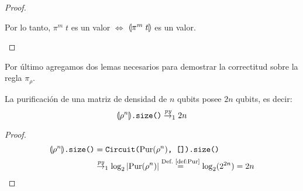 \begin{proof}
\begin{itemize}
Por lo tanto, $\pi^m\;t$ es un valor $\Leftrightarrow$ $\llparenthesis \pi^m\;t \rrparenthesis$ es un valor.
     
\end{itemize}

\end{proof}
Por último agregamos dos lemas necesarios para demostrar la correctitud sobre la regla $\pi_\rho$.
\begin{lema}\label{lem:rhosize}
La purificación de una matriz de densidad de $n$ qubits posee $2n$ qubits, es decir:
\vspace{0pt plus 20pt}
\begin{equation*}
    \texttt{\ensuremath{\llparenthesis \rho^n \rrparenthesis}.size()} \overset{\textit{py}}{\rightarrow}_1 2n
\end{equation*}
\vspace{0pt plus 20pt}
\end{lema}
\begin{proof}
    \begin{align*}
        \texttt{\ensuremath{\llparenthesis \rho^n \rrparenthesis}.size()} &= \texttt{Circuit(}\text{Pur}(\rho^n)\texttt{, []).size()} \\
        &\overset{\textit{py}}{\rightarrow}_1 \log_2|\text{Pur}(\rho^n)| \stackrel{\textrm{Def.~\ref{def:Pur}}}{=} \log_2(2^{2n}) = 2n
    \end{align*}
\end{proof}

